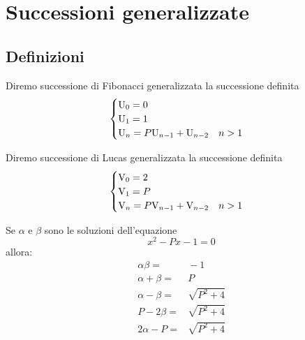 \chapter{Successioni generalizzate}
\section{Definizioni}
\begin{defn}
	Diremo successione di Fibonacci generalizzata la successione definita
	\begin{equation}
		\begin{cases}
			\mathrm{U}_{0}=0\\
			\mathrm{U}_{1}=1\\
			\mathrm{U}_{n}=P\mathrm{U}_{n-1}+\mathrm{U}_{n-2}\quad n>1\\
		\end{cases}
	\end{equation} 
\end{defn}\cite{Yalciner2013}
\begin{defn}
Diremo successione di Lucas generalizzata la successione definita
\begin{equation}
	\begin{cases}
		\mathrm{V}_{0}=2\\
		\mathrm{V}_{1}=P\\
		\mathrm{V}_{n}=P\mathrm{V}_{n-1}+\mathrm{V}_{n-2}\quad n>1\\
	\end{cases}
\end{equation}
\end{defn}\cite{Yalciner2013} 
\begin{lem}[Proprietà]
	Se $\alpha$ e $\beta$ sono le soluzioni dell'equazione \begin{equation}
		x^2-Px-1=0
	\end{equation} allora:
	\begin{align*}
		\alpha\beta=&{}-1\\
		\alpha+\beta=&{}P\\
		\alpha-\beta=&{}\sqrt{P^2+4}\\
		P-2\beta=&{}\sqrt{P^2+4}\\
		2\alpha-P =&{}\sqrt{P^2+4}\\
	\end{align*}
\end{lem}  
